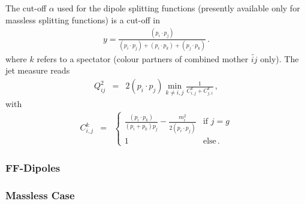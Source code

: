 \documentclass[a4paper,10pt]{scrartcl}
\begin{document}
The cut-off $\alpha$ used for the dipole splitting functions (presently 
available only for massless splitting functions) is a cut-off in
\begin{eqnarray}
 y = \frac{(p_i\cdot p_j)}{(p_i\cdot p_j)+(p_i\cdot p_k)+(p_j\cdot p_k)} \,.
\end{eqnarray}
where $k$ refers to a spectator (colour partners of combined mother
$\tilde{ij}$ only). The jet measure reads
\begin{eqnarray}
 Q_{ij}^2
& = & 2(p_i\cdot p_j) \min\limits_{k\neq i,j}\frac{1}{C_{i,j}^k+C_{j,i}^k} \,,
\end{eqnarray}
with
\begin{eqnarray}
 C_{i,j}^k
& = & \left\{\begin{array}{cc}
              \frac{(p_i\cdot p_k)}{(p_i+p_k)p_j}-\frac{m_i^2}{2(p_i\cdot p_j)}
		& \mbox{if } j=g \\ 
              1 & \mbox{else}\,.
             \end{array}\right.
\end{eqnarray}

\subsubsection{FF-Dipoles}

\subsubsection*{Massless Case}
\end{document}
